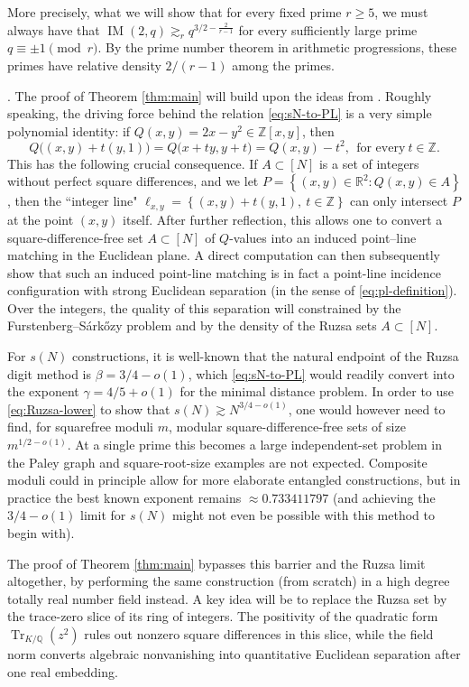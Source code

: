 \documentclass[11pt,reqno]{amsart}
\theoremstyle{definition}
\theoremstyle{remark}
\newcommand{\Q}{\mathbb{Q}}
\newcommand{\Tr}{\operatorname{Tr}}
\begin{document}
More precisely, what we will show that for every fixed prime $r\ge5$, we must always have that $\operatorname{IM}(2,q) \gtrsim_r q^{3/2-\frac{2}{r-1}}$ for every sufficiently large prime $q\equiv\pm1\pmod r$. By the prime number theorem in arithmetic progressions, these primes have relative density $2/(r-1)$ among the primes.

\medskip

.  The proof of Theorem \ref{thm:main} will build upon the ideas from \cite{HPVZ2026}. Roughly speaking, the driving force behind the relation \eqref{eq:sN-to-PL} is a very simple polynomial identity: if $Q(x,y)=2x-y^2 \in \mathbb{Z}[x,y]$, then
\[
        Q\bigl((x,y)+t(y,1)\bigr)=Q\bigl(x+ty,y+t\bigr)=Q(x,y)-t^2,\ \ \text{for every}\ t \in \mathbb{Z}.
\]
This has the following crucial consequence. If $A \subset [N]$ is a set of integers without perfect square differences, and we let $P = \left\{(x,y) \in \mathbb{R}^{2}: Q(x,y) \in A\right\}$, then the ``integer line"
$\ell_{x,y} = \left\{(x,y)+t(y,1), \ t \in \mathbb{Z}\right\}$ can only intersect $P$ at the point $(x,y)$ itself. After further reflection, this allows one to convert a square-difference-free set $A \subset [N]$ of $Q$-values into an induced point--line matching in the Euclidean plane. A direct computation can then subsequently show that such an induced point-line matching is in fact a point-line incidence configuration with strong Euclidean separation (in the sense of \eqref{eq:pl-definition}). Over the integers, the quality of this separation will constrained by the Furstenberg--S\'ark\H{o}zy problem and by the density of the Ruzsa sets $A \subset [N]$. 

For $s(N)$ constructions, it is well-known that the natural endpoint of the Ruzsa digit method is $\beta=3/4-o(1)$, which \eqref{eq:sN-to-PL} would readily convert into the exponent $\gamma=4/5+o(1)$ for the minimal distance problem. In order to use \eqref{eq:Ruzsa-lower} to show that $s(N) \gtrsim N^{3/4-o(1)}$, one would however need to find, for squarefree moduli $m$, modular square-difference-free sets of size $m^{1/2-o(1)}$. At a single prime this becomes a large independent-set problem in the Paley graph and square-root-size examples are not expected. Composite moduli could in principle allow for more elaborate entangled constructions, but in practice the best known exponent remains $\approx 0.733411797$ (and achieving the $3/4-o(1)$ limit for $s(N)$ might not even be possible with this method to begin with). 

The proof of Theorem \ref{thm:main} bypasses this barrier and the Ruzsa limit altogether, by performing the same construction (from scratch) in a high degree totally real number field instead. A key idea will be to replace the Ruzsa set by the trace-zero slice of its ring of integers. The positivity of the quadratic form $\Tr_{K/\Q}(z^2)$ rules out nonzero square differences in this slice, while the field norm converts algebraic nonvanishing into quantitative Euclidean separation after one real embedding. 
\end{document}

